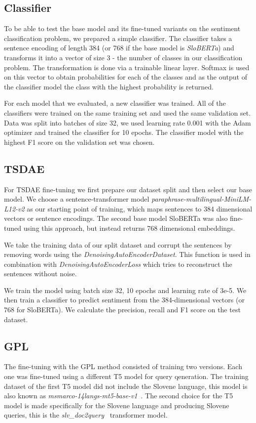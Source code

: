 \documentclass[fleqn,moreauthors,10pt]{ds_report}
\begin{document}
\subsection*{Classifier}

To be able to test the base model and its fine-tuned variants on the sentiment classification problem, we prepared a simple classifier. The classifier takes a sentence encoding of length 384 (or 768 if the base model is {\it SloBERTa}) and transforms it into a vector of size 3 - the number of classes in our classification problem. The transformation is done via a trainable linear layer. Softmax is used on this vector to obtain probabilities for each of the classes and as the output of the classifier model the class with the highest probability is returned.

For each model that we evaluated, a new classifier was trained. All of the classifiers were trained on the same training set and used the same validation set. Data was split into batches of size 32, we used learning rate 0.001 with the Adam optimizer and trained the classifier for 10 epochs. The classifier model with the highest F1 score on the validation set was chosen.


\subsection*{TSDAE}

For TSDAE fine-tuning we first prepare our dataset split and then select our base model.
We choose a sentence-transformer model {\it paraphrase-multilingual-MiniLM-L12-v2} as our starting point of training, which maps sentences to 384 dimensional vectors or sentence encodings. The second base model SloBERTa was also fine-tuned using this approach, but instead returns 768 dimensional embeddings.

We take the training data of our split dataset and corrupt the sentences by removing words using the {\it DenoisingAutoEncoderDataset}. This function is used in combination with {\it DenoisingAutoEncoderLoss} which tries to reconstruct the sentences without noise.

We train the model using batch size 32, 10 epochs and learning rate of 3e-5. We then train a classifier to predict sentiment from the 384-dimensional vectors (or 768 for SloBERTa). We calculate the precision, recall and F1 score on the test dataset.


\subsection*{GPL}
The fine-tuning with the GPL method consisted of training two versions. Each one was fine-tuned using a different T5 model for query qeneration. The training dataset of the first T5 model did not include the Slovene language, this model is also known as {\it msmarco-14langs-mt5-base-v1}~\cite{msmarco14langs}. The second choice for the T5 model is made specifically for the Slovene language and producing Slovene queries, this is the {\it slv\_doc2query}~\cite{boshko} transformer model.
\end{document}
